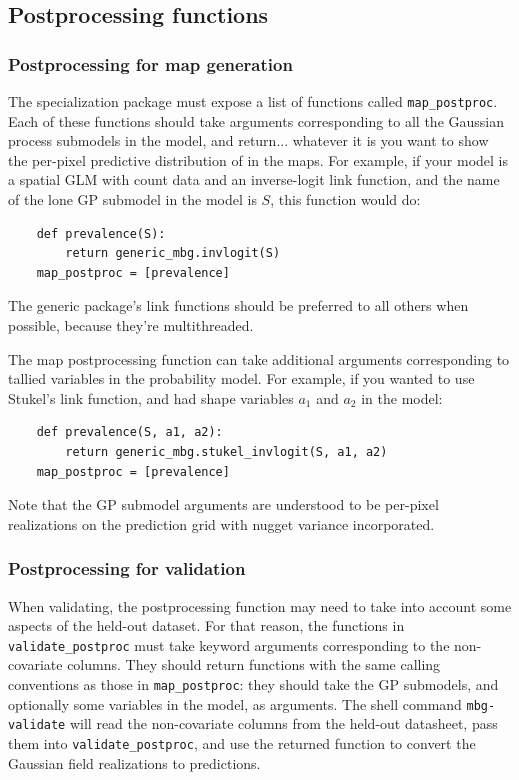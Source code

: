 \subsection{Postprocessing functions}

\subsubsection{Postprocessing for map generation}
The specialization package must expose a list of functions called \texttt{map\_postproc}. Each of these functions should take arguments corresponding to all the Gaussian process submodels in the model, and return... whatever it is you want to show the per-pixel predictive distribution of in the maps. For example, if your model is a spatial GLM with count data and an inverse-logit link function, and the name of the lone GP submodel in the model is $S$, this function would do:
\begin{verbatim}
    def prevalence(S):
        return generic_mbg.invlogit(S)
    map_postproc = [prevalence]
\end{verbatim}
The generic package's link functions should be preferred to all others when possible, because they're multithreaded.

The map postprocessing function can take additional arguments corresponding to tallied variables in the probability model. For example, if you wanted to use Stukel's link function, and had shape variables $a_1$ and $a_2$ in the model:
\begin{verbatim}
    def prevalence(S, a1, a2):
        return generic_mbg.stukel_invlogit(S, a1, a2)
    map_postproc = [prevalence]
\end{verbatim}
Note that the GP submodel arguments are understood to be per-pixel realizations on the prediction grid with nugget variance incorporated.

\subsubsection{Postprocessing for validation} 
When validating, the postprocessing function may need to take into account some aspects of the held-out dataset. For that reason, the functions in \texttt{validate\_postproc} must take keyword arguments corresponding to the non-covariate columns. They should return functions with the same calling conventions as those in \texttt{map\_postproc}: they should take the GP submodels, and optionally some variables in the model, as arguments. The shell command \texttt{mbg-validate} will read the non-covariate columns from the held-out datasheet, pass them into \texttt{validate\_postproc}, and use the returned function to convert the Gaussian field realizations to predictions. 

